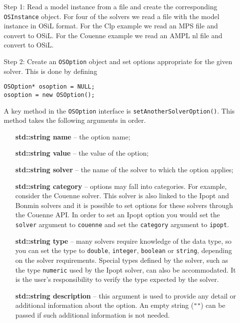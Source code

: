 \documentclass[11pt]{article}
\renewcommand{\_}{{\char"5F}}
\renewcommand{\{}{{\char"7B}}
\renewcommand{\}}{{\char"7D}}
\renewcommand{\^}{{\char"0D}}
\renewcommand{\'}{{\char"0D}}
\begin{document}
\begin{itemize}
\item[Step 1:]  Read a model instance from a file  and create the corresponding {\tt OSInstance} object.
For four of the solvers we read a file with the model instance in OSiL format. For the Clp example 
we read an MPS file and convert to OSiL. For the Couenne example we read an AMPL nl file and convert 
to OSiL.

\item[Step 2:]  Create an {\tt OSOption} object and set options appropriate for the given solver.   
This is done by defining

\begin{verbatim}
OSOption* osoption = NULL;
osoption = new OSOption();
\end{verbatim}

A key method in the {\tt OSOption} interface is {\tt setAnotherSolverOption()}.  This method 
takes the following arguments in order.

\begin{itemize}
\item[] {\bf std::string name} -- the option name;
\item[] {\bf std::string value}  -- the value of the option;
\item[] {\bf std::string solver} -- the name of the solver to which the option applies;
\item[] {\bf std::string category} -- options may fall into categories. For example, consider the  
Couenne solver.  This solver is also linked to the Ipopt and Bonmin solvers and  it is possible 
to set options for these solvers through the Couenne API. In order to set an Ipopt option 
you would set the {\tt solver} argument to {\tt couenne} and set the {\tt category} argument 
to {\tt ipopt}.

\item[] {\bf std::string type} -- many solvers require knowledge of the data type, so you can set 
the type to {\tt double}, {\tt integer}, {\tt boolean} or {\tt string}, depending on the solver 
requirements. Special types defined by the solver, such as the type {\tt numeric} used by the
Ipopt solver, can also be accommodated. It is the user's responsibility to verify the type
expected by the solver.


\item[] {\bf std::string  description} -- this argument is used to provide any detail or 
additional information about the option. An empty string ({\tt""}) can be passed if such additional
information is not needed.
\end{itemize}


\end{itemize}
\end{document}
